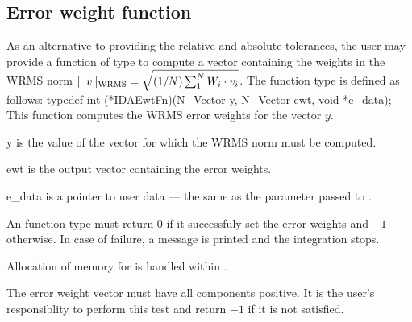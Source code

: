 \subsection{Error weight function}
\label{ss:ewtsetFn}
As an alternative to providing the relative and absolute tolerances, the user may
provide a function of type  to compute a vector  containing the
weights in the WRMS norm 
$\|\ v \|_{\mbox{\scriptsize WRMS}} = \sqrt{(1/N)\sum_1^N W_i \cdot v_i}$.
The function type  is defined as follows:
{
  typedef int (*IDAEwtFn)(N\_Vector y, N\_Vector ewt, void *e\_data);
}
{
  This function computes the WRMS error weights for the vector $y$.
}
{
  \begin{args}[e\_data]
  \item[y]
    is the value of the vector for which the WRMS norm must be computed.
  \item[ewt]
    is the output vector containing the error weights.
  \item[e\_data]
    is a pointer to user data --- the same as the       
    parameter passed to .   
  \end{args}
}
{
  An  function type must return $0$ if it successfuly set
  the error weights and $-1$ otherwise. In case of failure, a message is printed
  and the integration stops.
}
{
  Allocation of memory for  is handled within {\ida}.

  {\warn} The error weight vector must have all components positive. It is the
  user's responsiblity to perform this test and return $-1$ if it is not 
  satisfied.
}
